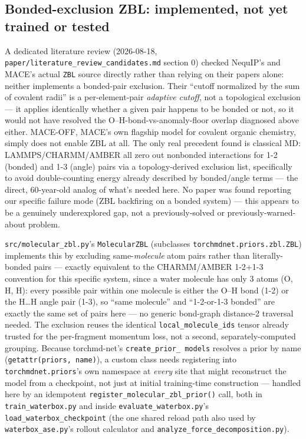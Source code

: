 \documentclass[11pt]{article}
\begin{document}
\subsection{Bonded-exclusion ZBL: implemented, not yet trained or tested}
\label{sec:q4-bonded-exclusion}

A dedicated literature review (2026-08-18,
\texttt{paper/literature\_review\_candidates.md} section 0) checked
NequIP's and MACE's actual \texttt{ZBL} source directly rather than relying
on their papers alone: neither implements a bonded-pair exclusion. Their
``cutoff normalized by the sum of covalent radii'' is a per-element-pair
\emph{adaptive cutoff}, not a topological exclusion --- it applies
identically whether a given pair happens to be bonded or not, so it would
not have resolved the O--H-bond-vs-anomaly-floor overlap diagnosed above
either. MACE-OFF, MACE's own flagship model for covalent organic chemistry,
simply does not enable ZBL at all. The only real precedent found is
classical MD: LAMMPS/CHARMM/AMBER all zero out nonbonded interactions for
1-2 (bonded) and 1-3 (angle) pairs via a topology-derived exclusion list,
specifically to avoid double-counting energy already described by
bonded/angle terms --- the direct, 60-year-old analog of what's needed here.
No paper was found reporting our specific failure mode (ZBL backfiring on a
bonded system) --- this appears to be a genuinely underexplored gap, not a
previously-solved or previously-warned-about problem.

\texttt{src/molecular\_zbl.py}'s \texttt{MolecularZBL} (subclasses
\texttt{torchmdnet.priors.zbl.ZBL}) implements this by excluding
same-\emph{molecule} atom pairs rather than literally-bonded pairs ---
exactly equivalent to the CHARMM/AMBER 1-2+1-3 convention for this specific
system, since a water molecule has only 3 atoms (O, H, H): every possible
pair within one molecule is either the O--H bond (1-2) or the H\ldots H
angle pair (1-3), so ``same molecule'' and ``1-2-or-1-3 bonded'' are exactly
the same set of pairs here --- no generic bond-graph distance-2 traversal
needed. The exclusion reuses the identical \texttt{local\_molecule\_ids}
tensor already trusted for the per-fragment momentum loss, not a second,
separately-computed grouping. Because torchmd-net's \texttt{create\_prior\_
models} resolves a prior by name (\texttt{getattr(priors, name)}), a custom
class needs registering into \texttt{torchmdnet.priors}'s own namespace at
\emph{every} site that might reconstruct the model from a checkpoint, not
just at initial training-time construction --- handled here by an
idempotent \texttt{register\_molecular\_zbl\_prior()} call, both in
\texttt{train\_waterbox.py} and inside
\texttt{evaluate\_waterbox.py}'s \texttt{load\_waterbox\_checkpoint} (the
one shared reload path also used by \texttt{waterbox\_ase.py}'s rollout
calculator and \texttt{analyze\_force\_decomposition.py}).
\end{document}
